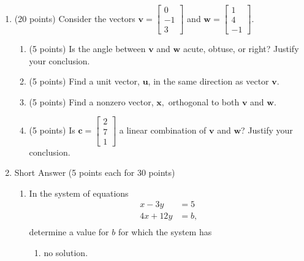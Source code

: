 \documentclass[11pt]{amsart}
\newcommand{\bc}{\mathbf{c}}
\newcommand{\bu}{\mathbf{u}}
\newcommand{\bv}{\mathbf{v}}
\newcommand{\bw}{\mathbf{w}}
\newcommand{\bx}{\mathbf{x}}
\begin{document}
\begin{enumerate}
\begin{enumerate}
	\begin{align*}
	2x -3y  &= 1\\
	-4x + 8y  &= -1\\
	\end{align*}
	\vspace{1.5in}
	\end{enumerate}

	\newpage
\item (20 points) Consider the vectors $\mathbf{v} = \begin{bmatrix} 0 \\ -1 \\ 3 \end{bmatrix}$ and $\mathbf{w} = \begin{bmatrix} 1 \\ 4 \\ -1 \end{bmatrix}$.

	\begin{enumerate}   
	\item (5 points) Is the angle between $\bv$ and $\bw$ acute, obtuse, or right? Justify your conclusion.   \vfill 
	\item (5 points) Find a unit vector, $\bu$, in the same direction as vector $\bv.$ \vfill
   	\item (5 points) Find a nonzero vector, $\bx,$ orthogonal to both $\mathbf{v}$ and $\mathbf{w}$. \vfill
    	
	\item (5 points) Is $\mathbf{\bc} = \begin{bmatrix} 2 \\ 7 \\ 1 \end{bmatrix}$ a linear combination of $\bv$ and $\bw$? Justify your conclusion.
	\vfill
	\end{enumerate}
	\newpage
\item Short Answer (5 points each for 30 points)
	\begin{enumerate}
	\item In the system of equations \begin{align*}
	x -3y  &= 5\\
	4x + 12y  &= b,\\
	\end{align*} determine a value for $b$ for which the system has\\
	
		\begin{enumerate}
		\item no solution.\\
		

\end{enumerate}
\end{enumerate}
\end{enumerate}
\end{document}

